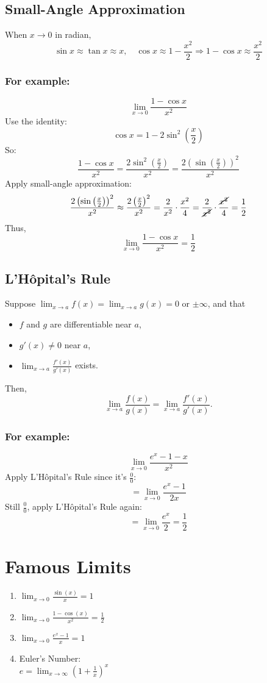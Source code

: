 \documentclass[11pt]{article}
\begin{document}
\subsection{Small-Angle Approximation}
When $x\to 0$ in radian,
\[
\sin x \approx \tan x \approx x, \quad \cos x \approx 1 - \frac{x^2}{2} \Rightarrow 1 - \cos x \approx \frac{x^2}{2}
\]
\subsubsection*{For example:}
\[
    \lim_{x \to 0} \frac{1 - \cos x}{x^2}
\]
Use the identity:
\[
    \cos x = 1-2\sin^2\left(\frac{x}{2}\right)
\]
So:
\[
    \frac{1 - \cos x}{x^2} = \frac{2\sin^2\left(\frac{x}{2}\right)}{x^2}
    =\frac{2\left(\sin\left(\frac{x}{2}\right)\right)^2}{x^2}
\]
Apply small-angle approximation:
\[  
    \frac{2\left(\sin\left(\frac{x}{2}\right)\right)^2}{x^2}
    \approx \frac{2\left(\frac{x}{2}\right)^2}{x^2}
    = \frac{2}{x^2}\cdot \frac{x^2}{4}
    = \frac{2}{\cancel{x^2}} \cdot \frac{\cancel{x^2}}{4}
    = \frac{1}{2}
\]
Thus,
\[
    \lim_{x \to 0} \frac{1 - \cos x}{x^2} = \frac{1}{2}
\]
\subsection{L'Hôpital's Rule}
Suppose $\displaystyle\lim_{x \to a} f(x) = \lim_{x \to a} g(x) = 0$ or $\pm \infty$, and that
\begin{itemize}
    \item $f$ and $g$ are differentiable near $a$,
    \item $g'(x) \neq 0$ near $a$,
    \item $\displaystyle \lim_{x \to a} \frac{f'(x)}{g'(x)}$ exists.
\end{itemize}
Then,
\[
    \lim_{x \to a} \frac{f(x)}{g(x)} = \lim_{x \to a} \frac{f'(x)}{g'(x)}.
\]
\subsubsection*{For example:}
\[
    \lim_{x \to 0} \frac{e^x - 1 - x}{x^2}
\]
Apply L'Hôpital's Rule since it's $\displaystyle\frac{0}{0}$:
\[
    = \lim_{x \to 0} \frac{e^x - 1}{2x}
\]
Still $\displaystyle\frac{0}{0}$, apply L'Hôpital's Rule again:
\[
    = \lim_{x \to 0} \frac{e^x}{2} = \frac{1}{2}
\]

\section{Famous Limits}
\begin{enumerate}
    \item $
        \displaystyle
        \lim_{x\to 0}\frac{\sin(x)}{x}=1
    $
    \item $
        \displaystyle
        \lim_{x\to 0}\frac{1-\cos(x)}{x^2}=\frac{1}{2}
    $
    \item $
        \displaystyle
        \lim_{x\to 0}\frac{e^x-1}{x}=1
    $
    \item Euler's Number:\\[10pt]$
        \displaystyle
        e=\lim_{x\to\infty}\left(1+\frac{1}{x}\right)^x
    $
\end{enumerate}
\end{document}
